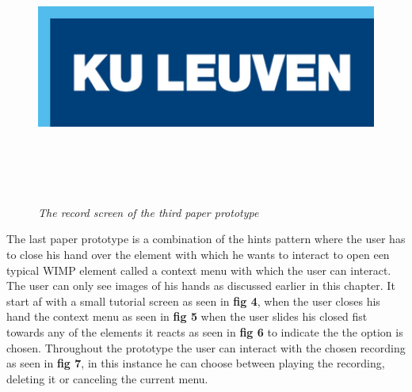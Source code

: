 \begin{figure}[H]
	\begin{center}
		\includegraphics[width=16cm, height=9cm]{KUL.png}
		\caption{\emph{The record screen of the third paper prototype}}
		\label{The record screen of the third paper prototype}
	\end{center}
\end{figure}

The last paper prototype is a combination of the hints pattern where the user has to close his hand over the element with which he wants to interact to open een typical WIMP element called a context menu with which the user can interact. The user can only see images of his hands as discussed earlier in this chapter. It start af with a small tutorial screen as seen in \textbf{ fig 4}, when the user closes his hand the context menu as seen in \textbf{ fig 5} when the user slides his closed fist towards any of the elements it reacts as seen in \textbf{ fig 6} to indicate the the option is chosen. Throughout the prototype the user can interact with the chosen recording as seen in \textbf{ fig 7}, in this instance he can choose between playing the recording, deleting it or canceling the current menu.

